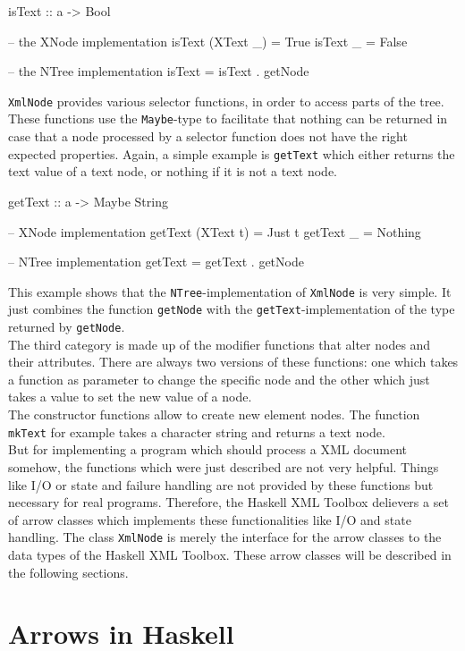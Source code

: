 \documentclass[11pt,a4paper,headsepline, bibtotoc]{scrreprt}
\begin{document}
\begin{code}
isText :: a -> Bool

-- the XNode implementation
isText (XText _)  = True
isText _          = False

-- the NTree implementation
isText = isText . getNode
\end{code}  

{\tt XmlNode} provides various selector functions, in order to access parts of the tree. These functions use the {\tt Maybe}-type to facilitate that nothing can be returned in case that a node processed by a selector function does not have the right expected properties. Again, a simple example is {\tt getText} which either returns the text value of a text node, or nothing if it is not a text node. 
\begin{code}
getText :: a -> Maybe String

-- XNode implementation
getText (XText t) = Just t
getText _         = Nothing

-- NTree implementation
getText   = getText . getNode  
\end{code}
This example shows that the {\tt NTree}-implementation of {\tt XmlNode} is very simple. It just combines the function {\tt getNode} with the {\tt getText}-implementation of the type returned by {\tt getNode}.\\
The third category is made up of the modifier functions that alter nodes and their attributes. There are always two versions of these functions: one which takes a function as parameter to change the specific node and the other which just takes a value to set the new value of a node.\\
The constructor functions allow to create new element nodes. The function {\tt mkText} for example takes a character string and returns a text node.\\
But for implementing a program which should process a XML document somehow, the functions which were just described are not very helpful. Things like I/O or state and failure handling are not provided by these functions but necessary for real programs. Therefore, the Haskell XML Toolbox delievers a set of arrow classes which implements these functionalities like I/O and state handling. The class \texttt{XmlNode} is merely the interface for the arrow classes to the data types of the Haskell XML Toolbox. These arrow classes will be described in the following sections.

\section{Arrows in Haskell}
\end{document}
